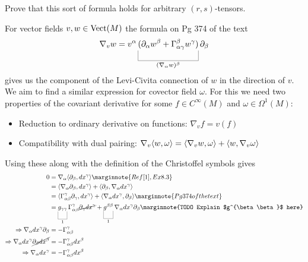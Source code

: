 \documentclass[10pt]{article}
\begin{document}
\begin{example}
	Prove that this sort of formula holds for arbitrary $(r,s)$-tensors.
\end{example}
\sol For vector fields $v,w \in \text{Vect}(M)$ the formula on Pg 374 of the text
$$
\nabla_v w=v^\alpha\ub{(\partial_\alpha w^\beta+\Gamma_{\alpha\gamma}^\beta w^\gamma)}{(\nabla_\alpha w)^\beta}\partial_\beta
$$
gives us the component of the Levi-Civita connection of $w$ in the direction of $v$. We aim to find a similar expression for covector field $\omega$. For this we need two properties of the covariant derivative for some $f \in C^\infty(M)$ and $\omega \in \Omega^1(M)$:
\begin{itemize}
	\item Reduction to ordinary derivative on functions: $\nabla_v f = v(f)$
	\item Compatibility with dual pairing: $\nabla_v\langle w,\omega\rangle=\langle\nabla_v w,\omega\rangle+\langle w,\nabla_v\omega\rangle$
\end{itemize}
Using these along with the definition of the Christoffel symbols gives
$$
\begin{aligned}
	0 &= \nabla_\alpha\bk{\partial_\beta, dx^\gamma}\marginnote{Ref [1], Ex 8.3}\\
	&= \bk{\nabla_\alpha\partial_\beta, dx^\gamma} + \bk{\partial_\beta,\nabla_\alpha dx^\gamma}\\
	&= \bk{\Gamma_{\alpha\beta}^\gamma\partial_\gamma, dx^\gamma} + \bk{\nabla_\alpha dx^\gamma,\partial_\beta}\marginnote{Pg 374 of the text}\\
	&= \ub{g_{\gamma\gamma}}{1}\Gamma_{\alpha\beta}^\gamma\cancel{\partial_\gamma dx^\gamma} + \ub{g^{\beta\beta}}{1}\nabla_\alpha dx^\gamma\partial_\beta\marginnote{TODO Explain $g^{\beta\beta}$ here}\\
	\Rightarrow \nabla_\alpha dx^\gamma \partial_\beta &=-\Gamma_{\alpha\beta}^\gamma\\
	\Rightarrow \nabla_\alpha dx^\gamma \cancel{\partial_\beta dx^\beta}&=-\Gamma_{\alpha\beta}^\gamma dx^\beta\\
	\Rightarrow \nabla_\alpha dx^\gamma&=-\Gamma_{\alpha\beta}^\gamma dx^\beta
\end{aligned}
$$
\end{document}
